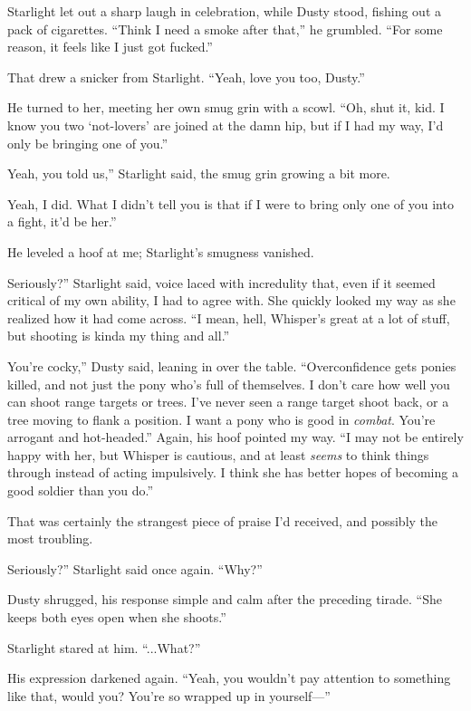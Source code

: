 Starlight let out a sharp laugh in celebration, while Dusty stood, fishing out a pack of cigarettes. “Think I need a smoke after that,” he grumbled. “For some reason, it feels like I just got fucked.”

That drew a snicker from Starlight. “Yeah, love you too, Dusty.”

He turned to her, meeting her own smug grin with a scowl. “Oh, shut it, kid. I know you two ‘not-lovers’ are joined at the damn hip, but if I had my way, I’d only be bringing one of you.”

\leavevmode{}Yeah, you told us,” Starlight said, the smug grin growing a bit more.

\leavevmode{}Yeah, I did. What I didn’t tell you is that if I were to bring only one of you into a fight, it’d be her.”

He leveled a hoof at me; Starlight’s smugness vanished.

\leavevmode{}Seriously?” Starlight said, voice laced with incredulity that, even if it seemed critical of my own ability, I had to agree with. She quickly looked my way as she realized how it had come across. “I mean, hell, Whisper’s great at a lot of stuff, but shooting is kinda my thing and all.”

\leavevmode{}You’re cocky,” Dusty said, leaning in over the table. “Overconfidence gets ponies killed, and not just the pony who’s full of themselves. I don’t care how well you can shoot range targets or trees. I’ve never seen a range target shoot back, or a tree moving to flank a position. I want a pony who is good in \textit{combat}. You’re arrogant and hot-headed.” Again, his hoof pointed my way. “I may not be entirely happy with her, but Whisper is cautious, and at least \textit{seems} to think things through instead of acting impulsively. I think she has better hopes of becoming a good soldier than you do.”

That was certainly the strangest piece of praise I’d received, and possibly the most troubling.

\leavevmode{}Seriously?” Starlight said once again. “Why?”

Dusty shrugged, his response simple and calm after the preceding tirade. “She keeps both eyes open when she shoots.”

Starlight stared at him. “...What?”

His expression darkened again. “Yeah, you wouldn’t pay attention to something like that, would you? You’re so wrapped up in yourself—”

